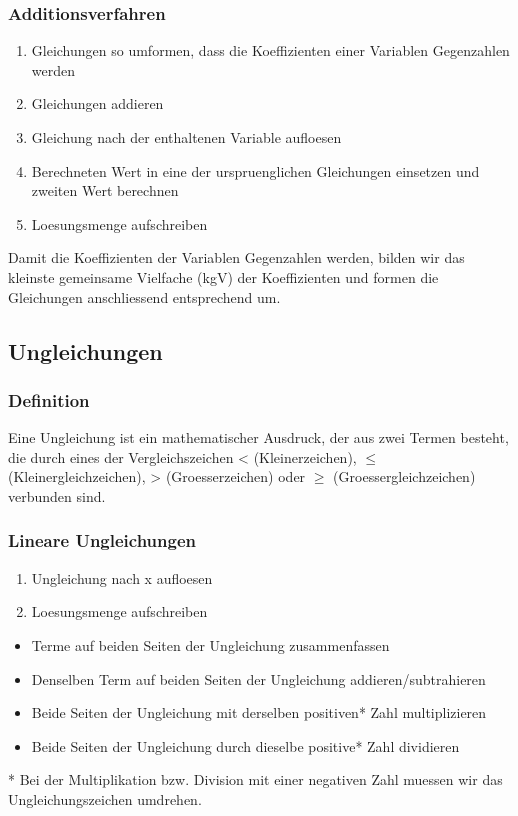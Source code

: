 \begin{multicols}{2}
    \subsubsection{Additionsverfahren}
    \vspace{-4mm}
    \begin{enumerate}
        \item     Gleichungen so umformen, dass die Koeffizienten einer Variablen Gegenzahlen werden
        \item     Gleichungen addieren
        \item     Gleichung nach der enthaltenen Variable aufloesen
        \item     Berechneten Wert in eine der urspruenglichen Gleichungen einsetzen und zweiten Wert berechnen
        \item     Loesungsmenge aufschreiben
    \end{enumerate}
    Damit die Koeffizienten der Variablen Gegenzahlen werden, bilden wir das kleinste gemeinsame Vielfache (kgV) der Koeffizienten und formen die Gleichungen anschliessend entsprechend um.

    \subsection{Ungleichungen}
    \vspace{-4mm}
    \subsubsection{Definition}
    \vspace{-4mm}
    Eine Ungleichung ist ein mathematischer Ausdruck, der aus zwei Termen besteht, die durch eines der Vergleichszeichen < (Kleinerzeichen), $\leq$ (Kleinergleichzeichen),
    > (Groesserzeichen) oder $\geq$ (Groessergleichzeichen) verbunden sind.
    \subsubsection{Lineare Ungleichungen}
    \vspace{-4mm}
    \begin{enumerate}
        \item Ungleichung nach x aufloesen
        \item Loesungsmenge aufschreiben
    \end{enumerate}
    \begin{itemize}
        \item Terme auf beiden Seiten der Ungleichung zusammenfassen
        \item Denselben Term auf beiden Seiten der Ungleichung addieren/subtrahieren
        \item Beide Seiten der Ungleichung mit derselben positiven* Zahl multiplizieren
        \item Beide Seiten der Ungleichung durch dieselbe positive* Zahl dividieren
    \end{itemize}
    * Bei der Multiplikation bzw. Division mit einer negativen Zahl muessen wir das Ungleichungszeichen umdrehen.\\~\\


\end{multicols}
